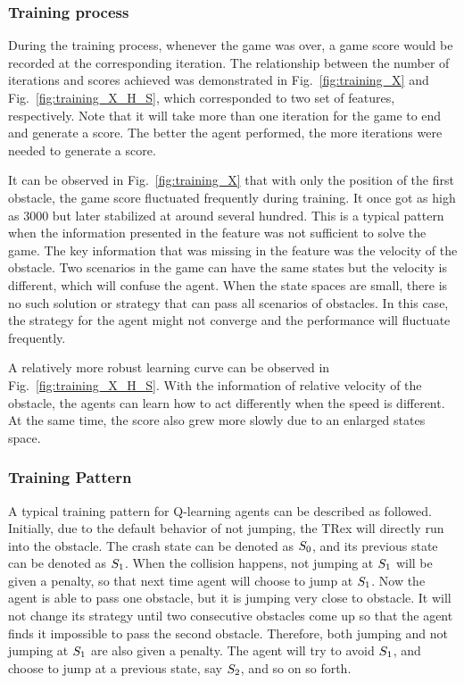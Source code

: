 \documentclass[conference]{IEEEtran}
\begin{document}
\subsubsection{Training process}
    During the training process, whenever the game was over, a game score would be recorded at the corresponding iteration. The relationship between the number of iterations and scores achieved was demonstrated in Fig.~\ref{fig:training_X} and Fig.~\ref{fig:training_X_H_S}, which corresponded to two set of features, respectively. Note that it will take more than one iteration for the game to end and generate a score. The better the agent performed, the more iterations were needed to generate a score. 
    
    It can be observed in Fig.~\ref{fig:training_X} that with only the position of the first obstacle, the game score fluctuated frequently during training. It once got as high as 3000 but later stabilized at around several hundred. This is a typical pattern when the information presented in the feature was not sufficient to solve the game. The key information that was missing in the feature was the velocity of the obstacle. Two scenarios in the game can have the same states but the velocity is different, which will confuse the agent. When the state spaces are small, there is no such solution or strategy that can pass all scenarios of obstacles. In this case, the strategy for the agent might not converge and the performance will fluctuate frequently.
    
    A relatively more robust learning curve can be observed in Fig.~\ref{fig:training_X_H_S}. With the information of relative velocity of the obstacle, the agents can learn how to act differently when the speed is different. At the same time, the score also grew more slowly due to an enlarged states space.


\subsubsection{Training Pattern}
    A typical training pattern for Q-learning agents can be described as followed. Initially, due to the default behavior of not jumping, the TRex will directly run into the obstacle. The crash state can be denoted as ${S}_{\textnormal{0}}$, and its previous state can be denoted as ${S}_{\textnormal{1}}$. When the collision happens, not jumping at ${S}_{\textnormal{1}}$ will be given a penalty, so that next time agent will choose to jump at ${S}_{\textnormal{1}}$. Now the agent is able to pass one obstacle, but it is jumping very close to obstacle. It will not change its strategy until two consecutive obstacles come up so that the agent finds it impossible to pass the second obstacle. Therefore, both jumping and not jumping at ${S}_{\textnormal{1}}$ are also given a penalty. The agent will try to avoid ${S}_{\textnormal{1}}$, and choose to jump at a previous state, say ${S}_{\textnormal{2}}$, and so on so forth.
    
\end{document}

